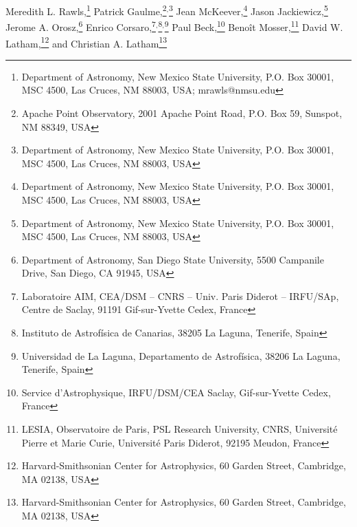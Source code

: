 Meredith L. Rawls,\footnote{Department of Astronomy, New Mexico State University, P.O. Box 30001, MSC 4500, Las Cruces, NM 88003, USA; mrawls@nmsu.edu}
\setcounter{footnote}{1}
Patrick Gaulme,\footnote{Apache Point Observatory, 2001 Apache Point Road, P.O. Box 59, Sunspot, NM 88349, USA}\setcounter{footnote}{0}$^{,}$\footnote{Department of Astronomy, New Mexico State University, P.O. Box 30001, MSC 4500, Las Cruces, NM 88003, USA}
\setcounter{footnote}{0}
Jean McKeever,\footnote{Department of Astronomy, New Mexico State University, P.O. Box 30001, MSC 4500, Las Cruces, NM 88003, USA}
\setcounter{footnote}{0}
Jason Jackiewicz,\footnote{Department of Astronomy, New Mexico State University, P.O. Box 30001, MSC 4500, Las Cruces, NM 88003, USA}
\setcounter{footnote}{2}
Jerome A. Orosz,\footnote{Department of Astronomy, San Diego State University, 5500 Campanile Drive, San Diego, CA 91945, USA}
Enrico Corsaro,\footnote{Laboratoire AIM, CEA/DSM – CNRS – Univ. Paris Diderot – IRFU/SAp, Centre de Saclay, 91191 Gif-sur-Yvette Cedex, France}$^{,}$\footnote{Instituto de Astrof\'isica de Canarias, 38205 La Laguna, Tenerife, Spain}$^{,}$\footnote{Universidad de La Laguna, Departamento de Astrof\'isica, 38206 La Laguna, Tenerife, Spain}
Paul Beck,\footnote{Service d'Astrophysique, IRFU/DSM/CEA Saclay, Gif-sur-Yvette Cedex, France}
Beno\^it Mosser,\footnote{LESIA, Observatoire de Paris, PSL Research University, CNRS, Universit\'e Pierre et Marie Curie, Universit\'e Paris Diderot, 92195 Meudon, France}
David W. Latham,\footnote{Harvard-Smithsonian Center for Astrophysics, 60 Garden Street, Cambridge, MA 02138, USA}
and
\setcounter{footnote}{8}
Christian A. Latham\footnote{Harvard-Smithsonian Center for Astrophysics, 60 Garden Street, Cambridge, MA 02138, USA}
